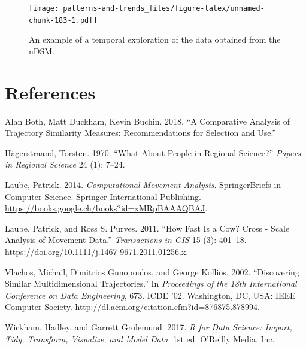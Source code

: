 \documentclass[]{book}
\begin{document}
\begin{figure}
\centering
\texttt{[image: patterns-and-trends\_files/figure-latex/unnamed-chunk-183-1.pdf]}
\caption{\label{fig:unnamed-chunk-183}An example of a temporal exploration of the data obtained from the nDSM.}
\end{figure}

\hypertarget{references}{%
\chapter*{References}\label{references}}

\hypertarget{refs}{}
\leavevmode\hypertarget{ref-both2018}{}%
Alan Both, Matt Duckham, Kevin Buchin. 2018. ``A Comparative Analysis of Trajectory Similarity Measures: Recommendations for Selection and Use.''

\leavevmode\hypertarget{ref-hagerstraand1970}{}%
Hägerstraand, Torsten. 1970. ``What About People in Regional Science?'' \emph{Papers in Regional Science} 24 (1): 7--24.

\leavevmode\hypertarget{ref-laube2014}{}%
Laube, Patrick. 2014. \emph{Computational Movement Analysis}. SpringerBriefs in Computer Science. Springer International Publishing. \url{https://books.google.ch/books?id=xMRpBAAAQBAJ}.

\leavevmode\hypertarget{ref-laube2011}{}%
Laube, Patrick, and Ross S. Purves. 2011. ``How Fast Is a Cow? Cross - Scale Analysis of Movement Data.'' \emph{Transactions in GIS} 15 (3): 401--18. \url{https://doi.org/10.1111/j.1467-9671.2011.01256.x}.

\leavevmode\hypertarget{ref-vlachos2002}{}%
Vlachos, Michail, Dimitrios Gunopoulos, and George Kollios. 2002. ``Discovering Similar Multidimensional Trajectories.'' In \emph{Proceedings of the 18th International Conference on Data Engineering}, 673. ICDE '02. Washington, DC, USA: IEEE Computer Society. \url{http://dl.acm.org/citation.cfm?id=876875.878994}.

\leavevmode\hypertarget{ref-wickham2017}{}%
Wickham, Hadley, and Garrett Grolemund. 2017. \emph{R for Data Science: Import, Tidy, Transform, Visualize, and Model Data}. 1st ed. O'Reilly Media, Inc.
\end{document}
